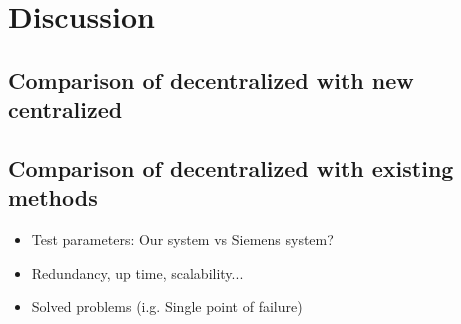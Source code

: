 \chapter{Discussion}

\section{Comparison of decentralized with new centralized}

\section{Comparison of decentralized with existing methods}

\begin{itemize}
	\item Test parameters: Our system vs Siemens system?
	\item Redundancy, up time, scalability...
	\item Solved problems (i.g. Single point of failure)
\end{itemize}